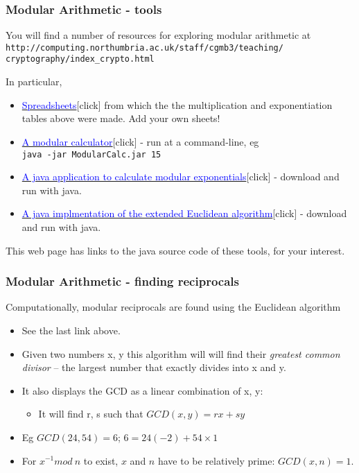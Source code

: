 \documentclass[10pt, hyperref={pdfpagelabels=false}]{beamer}
\begin{document}
\begin{frame}
\frametitle{Modular Arithmetic - tools}
You will find a number of resources for exploring modular arithmetic at 
\texttt{\small\color{blue}http://computing.northumbria.ac.uk/staff/cgmb3/teaching/\\cryptography/index\_crypto.html}

In particular, 
\begin{itemize}
\item \href{http://computing.northumbria.ac.uk/staff/cgmb3/teaching/cryptography/ModArithTables.xls}{\textcolor{blue}{Spreadsheets}}[click] from which the the multiplication and exponentiation tables above were made. Add your own sheets!
\item \href{http://computing.northumbria.ac.uk/staff/cgmb3/teaching/cryptography/ModularCalc.jar}{\textcolor{blue}{A modular calculator}}[click] - run at a command-line, eg\\ \texttt{\color{brown}java -jar ModularCalc.jar 15} 
\item \href{http://computing.northumbria.ac.uk/staff/cgmb3/teaching/cryptography/ModExp/ModExpAplt.class}{\textcolor{blue}{A java application to calculate modular exponentials}}[click] - download and run with java.
\item \href{http://computing.northumbria.ac.uk/staff/cgmb3/teaching/cryptography/EuclideanAlg/EuclideanAlg.class}{\textcolor{blue}{A java implmentation of the extended Euclidean algorithm}}[click] - download and run with java.
\end{itemize}
This web page has links to the java source code of these tools, for your interest.
\end{frame}

\begin{frame}
\frametitle{Modular Arithmetic - finding reciprocals}
Computationally, modular reciprocals are found using the Euclidean algorithm
\begin{itemize}
\item See the last link above.
\item Given two numbers x, y this algorithm will will find their \emph{greatest common divisor} – the largest number that exactly divides into x and y.
\item It also displays the GCD as a linear combination of x, y:
  \begin{itemize}
  \item It will find r, s such that $GCD(x, y) = rx + sy$
  \end{itemize}
\item Eg $GCD(24, 54) = 6$; $6 = 24(-2) + 54 \times 1$
\item For $x^{-1} mod~n$ to exist, $x$ and $n$ have to be relatively prime: $GCD(x, n) = 1$.
\end{itemize}
\end{frame}
\end{document}

